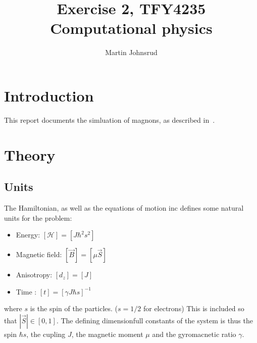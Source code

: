 \documentclass{article}
\title{Exercise 2, TFY4235 Computational physics}
\author{Martin Johnsrud}
\date{}
\begin{document}
    \maketitle
    \section*{Introduction}
    This report documents the simluation of magnons, as described in~\cite{exercise}.

    \section*{Theory}
    \subsection*{Units}
    The Hamiltonian, as well as the equations of motion inc \cite{exercise} defines some natural units for the problem: 
    \begin{itemize}
        \item Energy: $[\mathcal H] = [J \hbar^2 s^2]$
        \item Magnetic field: $[\vec B] = [\mu \vec S ]$
        \item Anisotropy: $[d_z] = [J]$
        \item Time : $[t] = [\gamma J \hbar s]^{-1}$
    \end{itemize}
     where $s$ is the spin of the particles. ($s=1/2$ for electrons) This is included so that $|\vec S|\in[0, 1]$. The defining dimensionfull constants of the system is thus the spin $\hbar s$, the cupling $J$, the magnetic moment $\mu$ and the gyromacnetic ratio $\gamma$.
\end{document}
